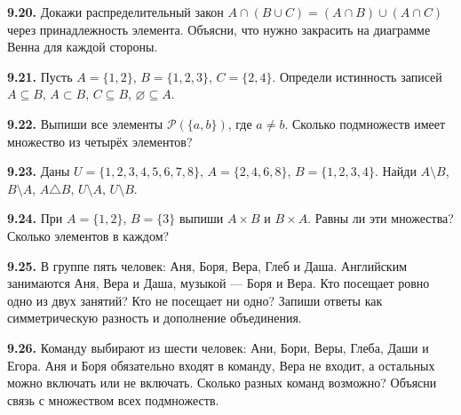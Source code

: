 \noindent\begin{minipage}[t]{\linewidth}\textbf{9.20.}\starmark{} Докажи распределительный закон \(A\cap(B\cup C)=(A\cap B)\cup(A\cap C)\) через принадлежность элемента. Объясни, что нужно закрасить на диаграмме Венна для каждой стороны.\par\end{minipage}\par
\noindent\begin{minipage}[t]{\linewidth}\textbf{9.21.} Пусть \(A=\{1,2\}\), \(B=\{1,2,3\}\), \(C=\{2,4\}\). Определи истинность записей \(A\subseteq B\), \(A\subset B\), \(C\subseteq B\), \(\varnothing\subseteq A\).\par\end{minipage}\par
\noindent\begin{minipage}[t]{\linewidth}\textbf{9.22.} Выпиши все элементы \(\mathcal P(\{a,b\})\), где \(a\ne b\). Сколько подмножеств имеет множество из четырёх элементов?\par\end{minipage}\par
\noindent\begin{minipage}[t]{\linewidth}\textbf{9.23.} Даны \(U=\{1,2,3,4,5,6,7,8\}\), \(A=\{2,4,6,8\}\), \(B=\{1,2,3,4\}\). Найди \(A\setminus B\), \(B\setminus A\), \(A\triangle B\), \(U\setminus A\), \(U\setminus B\).\par\end{minipage}\par
\noindent\begin{minipage}[t]{\linewidth}\textbf{9.24.} При \(A=\{1,2\}\), \(B=\{3\}\) выпиши \(A\times B\) и \(B\times A\). Равны ли эти множества? Сколько элементов в каждом?\par\end{minipage}\par
\noindent\begin{minipage}[t]{\linewidth}\textbf{9.25.} В группе пять человек: Аня, Боря, Вера, Глеб и Даша. Английским занимаются Аня, Вера и Даша, музыкой — Боря и Вера. Кто посещает ровно одно из двух занятий? Кто не посещает ни одно? Запиши ответы как симметрическую разность и дополнение объединения.\par\end{minipage}\par
\noindent\begin{minipage}[t]{\linewidth}\textbf{9.26.}\starmark{} Команду выбирают из шести человек: Ани, Бори, Веры, Глеба, Даши и Егора. Аня и Боря обязательно входят в команду, Вера не входит, а остальных можно включать или не включать. Сколько разных команд возможно? Объясни связь с множеством всех подмножеств.\par\end{minipage}\par

